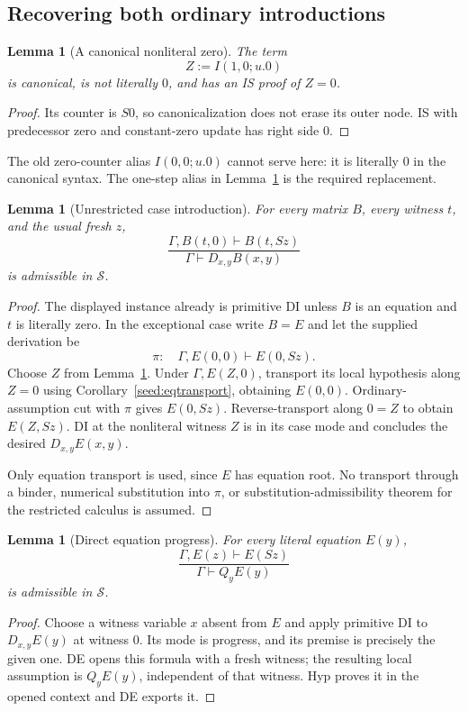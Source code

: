 \documentclass[11pt,a4paper]{article}
\newtheorem{lemma}[theorem]{Lemma}
\theoremstyle{definition}
\begin{document}
\subsection{Recovering both ordinary introductions}

\begin{lemma}[A canonical nonliteral zero]\label{seed:alias}
The term
\[
 Z:=I(1,0;u.0)
\]
is canonical, is not literally $0$, and has an IS proof of $Z=0$.
\end{lemma}
\begin{proof}
Its counter is $S0$, so canonicalization does not erase its outer node.
IS with predecessor zero and constant-zero update has right side $0$.
\end{proof}

The old zero-counter alias $I(0,0;u.0)$ cannot serve here: it is literally
$0$ in the canonical syntax. The one-step alias in
Lemma~\ref{seed:alias} is the required replacement.

\begin{lemma}[Unrestricted case introduction]\label{seed:case}
For every matrix $B$, every witness $t$, and the usual fresh $z$,
\[
 \frac{\Gamma,B(t,0)\vdash B(t,Sz)}
 {\Gamma\vdash D_{x,y}B(x,y)}
 \tag{D-case}\label{seed:Dcase}
\]
is admissible in $\mathcal S$.
\end{lemma}
\begin{proof}
The displayed instance already is primitive DI unless $B$ is an equation
and $t$ is literally zero. In the exceptional case write $B=E$ and
let the supplied derivation be
\[
 \pi:\quad\Gamma,E(0,0)\vdash E(0,Sz).
\]
Choose $Z$ from Lemma~\ref{seed:alias}. Under
$\Gamma,E(Z,0)$, transport its local hypothesis along $Z=0$ using
Corollary~\ref{seed:eqtransport}, obtaining $E(0,0)$.
Ordinary-assumption cut with $\pi$ gives $E(0,Sz)$.
Reverse-transport along $0=Z$ to obtain $E(Z,Sz)$.
DI at the nonliteral witness $Z$ is in its case mode and concludes
the desired $D_{x,y}E(x,y)$.

Only equation transport is used, since $E$ has equation root.
No transport through a binder, numerical substitution into $\pi$, or
substitution-admissibility theorem for the restricted calculus is assumed.
\end{proof}

\begin{lemma}[Direct equation progress]\label{seed:progress}
For every literal equation $E(y)$,
\[
 \frac{\Gamma,E(z)\vdash E(Sz)}{\Gamma\vdash Q_yE(y)}
 \tag{Q-progress}\label{seed:Qprogress}
\]
is admissible in $\mathcal S$.
\end{lemma}
\begin{proof}
Choose a witness variable $x$ absent from $E$ and apply primitive DI
to $D_{x,y}E(y)$ at witness $0$. Its mode is progress, and its premise
is precisely the given one. DE opens this formula with a fresh witness;
the resulting local assumption is $Q_yE(y)$, independent of that witness.
Hyp proves it in the opened context and DE exports it.
\end{proof}
\end{document}
